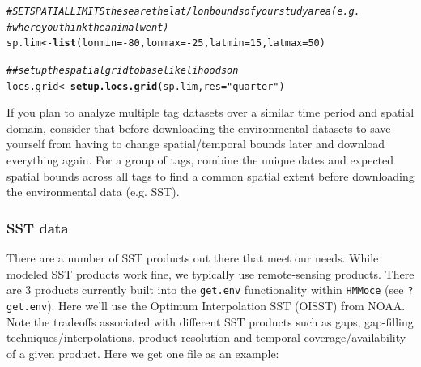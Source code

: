 \documentclass{article}\usepackage[]{graphicx}\usepackage[]{color}
\makeatletter
\newcommand{\hlnum}[1]{\textcolor[rgb]{0.686,0.059,0.569}{#1}}%
\newcommand{\hlstr}[1]{\textcolor[rgb]{0.192,0.494,0.8}{#1}}%
\newcommand{\hlcom}[1]{\textcolor[rgb]{0.678,0.584,0.686}{\textit{#1}}}%
\newcommand{\hlopt}[1]{\textcolor[rgb]{0,0,0}{#1}}%
\newcommand{\hlstd}[1]{\textcolor[rgb]{0.345,0.345,0.345}{#1}}%
\newcommand{\hlkwb}[1]{\textcolor[rgb]{0.69,0.353,0.396}{#1}}%
\newcommand{\hlkwc}[1]{\textcolor[rgb]{0.333,0.667,0.333}{#1}}%
\newcommand{\hlkwd}[1]{\textcolor[rgb]{0.737,0.353,0.396}{\textbf{#1}}}%
\newenvironment{kframe}{%
 \def\at@end@of@kframe{}%
 \ifinner\ifhmode%
  \def\at@end@of@kframe{\end{minipage}}%
  \begin{minipage}{\columnwidth}%
 \fi\fi%
 \def\FrameCommand##1{\hskip\@totalleftmargin \hskip-\fboxsep
 \colorbox{shadecolor}{##1}\hskip-\fboxsep
     \hskip-\linewidth \hskip-\@totalleftmargin \hskip\columnwidth}%
 \MakeFramed {\advance\hsize-\width
   \@totalleftmargin\z@ \linewidth\hsize
   \@setminipage}}%
 {\par\unskip\endMakeFramed%
 \at@end@of@kframe}
\newenvironment{knitrout}{}{} %
\makeatother
\begin{document}
\begin{knitrout}\small
{}\color{fgcolor}\begin{kframe}
\begin{alltt}
\hlcom{# SET SPATIAL LIMITS these are the lat/lon bounds of your study area (e.g.}
\hlcom{# where you think the animal went)}
\hlstd{sp.lim} \hlkwb{<-} \hlkwd{list}\hlstd{(}\hlkwc{lonmin} \hlstd{=} \hlopt{-}\hlnum{80}\hlstd{,} \hlkwc{lonmax} \hlstd{=} \hlopt{-}\hlnum{25}\hlstd{,} \hlkwc{latmin} \hlstd{=} \hlnum{15}\hlstd{,} \hlkwc{latmax} \hlstd{=} \hlnum{50}\hlstd{)}

\hlcom{## setup the spatial grid to base likelihoods on}
\hlstd{locs.grid} \hlkwb{<-} \hlkwd{setup.locs.grid}\hlstd{(sp.lim,} \hlkwc{res} \hlstd{=} \hlstr{"quarter"}\hlstd{)}
\end{alltt}
\end{kframe}
\end{knitrout}

If you plan to analyze multiple tag datasets over a similar time period and spatial domain, consider that before downloading the environmental datasets to save yourself from having to change spatial/temporal bounds later and download everything again. For a group of tags, combine the unique dates and expected spatial bounds across all tags to find a common spatial extent before downloading the environmental data (e.g. SST).

\subsubsection{SST data}

There are a number of SST products out there that meet our needs. While modeled SST products work fine, we typically use remote-sensing products. There are 3 products currently built into the \texttt{get.env} functionality within \texttt{HMMoce} (see \texttt{?get.env}). Here we'll use the Optimum Interpolation SST (OISST) from NOAA. Note the tradeoffs associated with different SST products such as gaps, gap-filling techniques/interpolations, product resolution and temporal coverage/availability of a given product. Here we get one file as an example:
\end{document}
